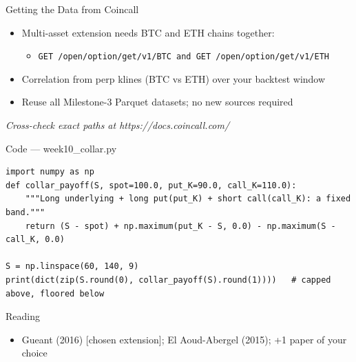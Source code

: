 \documentclass[aspectratio=169,10pt]{beamer}
\begin{document}
\begin{frame}{Getting the Data from Coincall}
\begin{itemize}
  \item Multi-asset extension needs BTC and ETH chains together:
  \begin{itemize}\item \texttt{\small GET /open/option/get/v1/BTC   and   GET /open/option/get/v1/ETH}\end{itemize}
  \item Correlation from perp klines (BTC vs ETH) over your backtest window
  \item Reuse all Milestone-3 Parquet datasets; no new sources required
\end{itemize}
\vspace{2pt}\tiny\textit{Cross-check exact paths at https://docs.coincall.com/}
\end{frame}

\begin{frame}[fragile]{Code --- week10\_collar.py}
\begin{lstlisting}
import numpy as np
def collar_payoff(S, spot=100.0, put_K=90.0, call_K=110.0):
    """Long underlying + long put(put_K) + short call(call_K): a fixed band."""
    return (S - spot) + np.maximum(put_K - S, 0.0) - np.maximum(S - call_K, 0.0)

S = np.linspace(60, 140, 9)
print(dict(zip(S.round(0), collar_payoff(S).round(1))))   # capped above, floored below
\end{lstlisting}
\end{frame}
\begin{frame}{Reading}
\begin{itemize}
  \item Gueant (2016) [chosen extension]; El Aoud-Abergel (2015); +1 paper of your choice
\end{itemize}
\end{frame}
\end{document}
